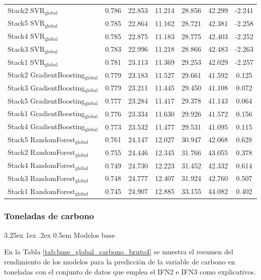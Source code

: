 \documentclass[a4paper,twocolumn]{article}
\makeatletter
\renewcommand\paragraph{\@startsection{paragraph}{4}{\z@}%
  {3.25ex \@plus1ex \@minus.2ex}%
  {0.5em}%
  {\normalfont\normalsize\bfseries}}
\newcommand{\subsubsubsection}[1]{\paragraph{#1}}
\makeatother
\begin{document}
\begin{table}
{\begin{tabular}{p{4.5cm}cccccc}
    Stack2 SVR$_{\text{global}}$ & 0.786 & 22.853 & 11.214 & 28.856 & 42.299 & -2.241 \\
    Stack5 SVR$_{\text{global}}$ & 0.785 & 22.864 & 11.162 & 28.721 & 42.381 & -2.258 \\
    Stack4 SVR$_{\text{global}}$ & 0.785 & 22.875 & 11.183 & 28.775 & 42.403 & -2.252 \\
    Stack3 SVR$_{\text{global}}$ & 0.783 & 22.996 & 11.218 & 28.866 & 42.483 & -2.263 \\
    Stack1 SVR$_{\text{global}}$ & 0.781 & 23.113 & 11.369 & 29.253 & 42.029 & -2.257 \\
    Stack2 GradientBoosting$_{\text{global}}$ & 0.779 & 23.183 & 11.527 & 29.661 & 41.592 & 0.125 \\
    Stack3 GradientBoosting$_{\text{global}}$ & 0.779 & 23.211 & 11.445 & 29.450 & 41.108 & 0.072 \\
    Stack5 GradientBoosting$_{\text{global}}$ & 0.777 & 23.284 & 11.417 & 29.378 & 41.143 & 0.064 \\
    Stack1 GradientBoosting$_{\text{global}}$ & 0.776 & 23.334 & 11.630 & 29.926 & 41.572 & 0.156 \\
    Stack4 GradientBoosting$_{\text{global}}$ & 0.773 & 23.532 & 11.477 & 29.531 & 41.095 & 0.115 \\
    Stack5 RandomForest$_{\text{global}}$ & 0.761 & 24.147 & 12.027 & 30.947 & 42.068 & 0.628 \\
    Stack2 RandomForest$_{\text{global}}$ & 0.755 & 24.446 & 12.345 & 31.766 & 43.055 & 0.378 \\
    Stack4 RandomForest$_{\text{global}}$ & 0.749 & 24.730 & 12.223 & 31.452 & 42.332 & 0.614 \\
    Stack3 RandomForest$_{\text{global}}$ & 0.748 & 24.777 & 12.407 & 31.924 & 42.760 & 0.507 \\
    Stack1 RandomForest$_{\text{global}}$ & 0.745 & 24.907 & 12.885 & 33.155 & 44.082 & 0.402 \\
            \bottomrule
    \end{tabular}
    }
\end{table}


\subsubsection{Toneladas de carbono}

\subsubsubsection{Modelos base}

En la Tabla \ref{tab:base_global_carbono_bruto4} se muestra el resumen del rendimiento de los modelos para la predicción de la variable de carbono en toneladas con el conjunto de datos que emplea el IFN2 e IFN3 como explicativos.
\end{document}
